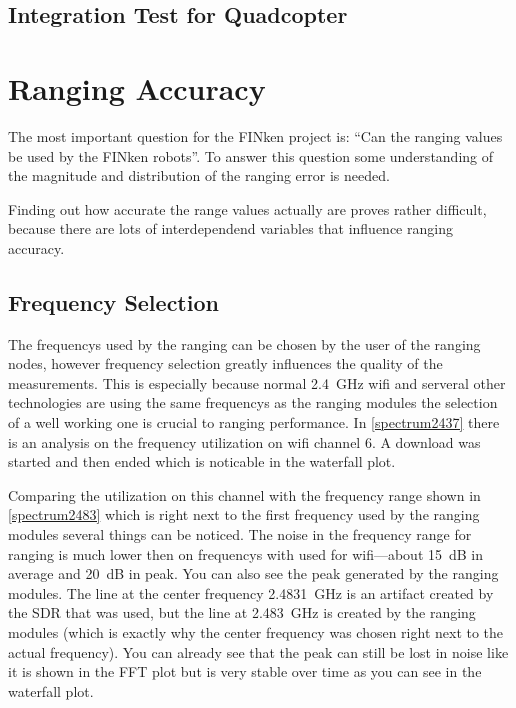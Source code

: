 \subsection{Integration Test for Quadcopter}


\section{Ranging Accuracy}

The most important question for the FINken project is: \enquote{Can the ranging values be used by the FINken robots}.
To answer this question some understanding of the magnitude and distribution of the ranging error is needed.

Finding out how accurate the range values actually are proves rather difficult, because there are lots of interdependend variables that influence ranging accuracy.

\subsection{Frequency Selection}
\label{freqencyselection}
The frequencys used by the ranging can be chosen by the user of the ranging nodes,
however frequency selection greatly influences the quality of the measurements.
This is especially because normal \SI{2.4}{\giga\hertz} wifi and serveral other technologies are using the same frequencys as the ranging modules the selection of a well working one is crucial to ranging performance.
In \autoref{spectrum2437} there is an analysis on the frequency utilization on wifi channel 6.
A download was started and then ended which is noticable in the waterfall plot.

Comparing the utilization on this channel with the frequency range shown in \autoref{spectrum2483} which is right next to the first frequency used by the ranging modules several things can be noticed.
The noise in the frequency range for ranging is much lower then on frequencys with used for wifi—about \SI{15}{dB} in average and \SI{20}{dB} in peak.
You can also see the peak generated by the ranging modules.
The line at the center frequency \SI{2.4831}{\giga\hertz} is an artifact created by the SDR that was used, but the line at \SI{2.483}{\giga\hertz} is created by the ranging modules (which is exactly why the center frequency was chosen right next to the actual frequency).
You can already see that the peak can still be lost in noise like it is shown in the FFT plot but is very stable over time as you can see in the waterfall plot.

